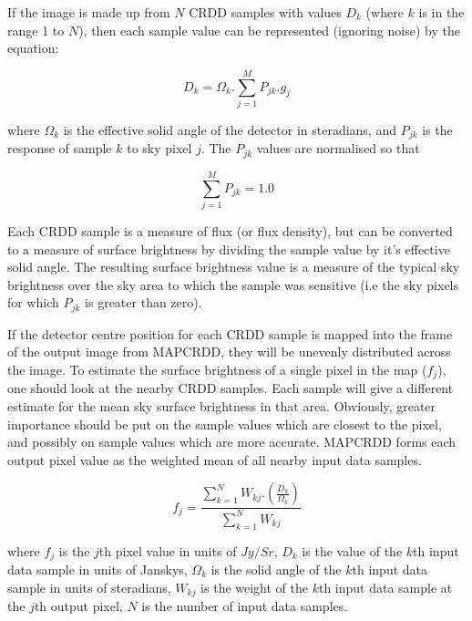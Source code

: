 If the image is made up from $N$ CRDD samples with values $D_{k}$ (where $k$ is
in the range 1 to $N$), then each sample value can be represented (ignoring
noise) by the equation:

\begin {equation}
D_{k}=\Omega_{k}.\sum_{j=1}^{M} P_{jk}.g_{j}
\end {equation}

where $\Omega_{k}$ is the effective solid angle of the detector in steradians,
and $P_{jk}$ is the response of sample $k$ to sky pixel $j$. The $P_{jk}$ values
are normalised so that

\begin {equation}
\sum_{j=1}^{M} P_{jk} = 1.0
\end {equation}

Each CRDD sample is a measure of flux (or flux density), but can be converted to
a measure of surface brightness by dividing the sample value by it's effective
solid angle. The resulting surface brightness value is a measure of the typical
sky brightness over the sky area to which the sample was sensitive (i.e the sky
pixels for which $P_{jk}$ is greater than zero).

If the detector centre position for each CRDD sample is mapped into the frame of
the output image from MAPCRDD, they will be unevenly distributed across the
image. To estimate the surface brightness of a single pixel in the map
($f_{j}$), one should look at the nearby CRDD samples. Each sample will give a
different estimate for the mean sky surface brightness in that area. Obviously,
greater importance should be put on the sample values which are closest to the
pixel, and possibly on sample values which are more accurate. MAPCRDD forms each
output pixel value as the weighted mean of all nearby input data samples.

\begin{equation}
f_{j}=\frac{\sum_{k=1}^{N}W_{kj}.(\frac{D_{k}}{\Omega_{k}})}
{\sum_{k=1}^{N}W_{kj}}
\label {EQ:FJ}
\end{equation}

where $f_{j}$ is the $j$th pixel value in units of $Jy/Sr$, $D_{k}$ is the value
of the $k$th input data sample in units of Janskys, $\Omega_{k}$ is the solid
angle of the $k$th input data sample in units of steradians, $W_{kj}$ is the
weight of the $k$th input data sample at the $j$th output pixel, $N$ is the
number of input data samples.

